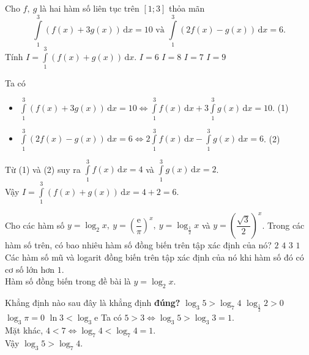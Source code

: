 \begin{ex}%
	Cho $f,~g$ là hai hàm số liên tục trên $[1;3]$ thỏa mãn
	\[\displaystyle\int\limits_1^3 \left(f(x)+3g(x)\right)\mathrm{\,d}x=10\text{ và } \displaystyle\int\limits_1^3 \left(2f(x)-g(x)\right)\mathrm{\,d}x=6.\] 
	Tính $I=\displaystyle\int\limits_1^3 \left(f(x)+g(x)\right)\mathrm{\,d}x$.
	\choice
	{\True $I=6$}
	{$I=8$}
	{$I=7$}
	{$I=9$}
	\loigiai
	{
		Ta có 
		\begin{itemize}
			\item $\displaystyle\int\limits_1^3 \left(f(x)+3g(x)\right)\mathrm{\,d}x=10\Leftrightarrow\displaystyle\int\limits_1^3 f(x)\mathrm{\,d}x+3\displaystyle\int\limits_1^3 g(x)\mathrm{\,d}x=10$. \qquad(1)
			\item $\displaystyle\int\limits_1^3 \left(2f(x)-g(x)\right)\mathrm{\,d}x=6\Leftrightarrow\displaystyle2\int\limits_1^3 f(x)\mathrm{\,d}x-\displaystyle\int\limits_1^3 g(x)\mathrm{\,d}x=6$. \qquad(2)
		\end{itemize}
		Từ (1) và (2) suy ra $\displaystyle\int\limits_1^3 f(x)\mathrm{\,d}x=4$ và $\displaystyle\int\limits_1^3 g(x)\mathrm{\,d}x=2$.\\
		Vậy $I=\displaystyle\int\limits_1^3 \left(f(x)+g(x)\right)\mathrm{\,d}x=4+2=6$.
	}
\end{ex}

\begin{ex}%
	Cho các hàm số $y=\log_2 x,~ y=\left(\dfrac{\mathrm{e}}{\pi}\right)^x,~ y=\log_{\tfrac{1}{2}} x$ và $y=\left(\dfrac{\sqrt{3}}{2}\right)^x$. Trong các hàm số trên, có bao nhiêu hàm số đồng biến trên tập xác định của nó?
	\choice
	{$2$}
	{$4$}
	{$3$}
	{\True $1$}
	\loigiai
	{
		Các hàm số mũ và logarit đồng biến trên tập xác định của nó khi hàm số đó có cơ số lớn hơn $1$.\\
		Hàm số đồng biến trong đề bài là $y=\log_2 x$.
	}
\end{ex}

\begin{ex}%
	Khẳng định nào sau đây là khẳng định \textbf{đúng?}
	\choice
	{\True $\log_3 5>\log_7 4$}
	{$\log_{\tfrac{1}{2}} 2>0$}
	{$\log_3 \pi=0$}
	{$\ln 3<\log_3 \mathrm{e}$}
	\loigiai
	{
		Ta có $5>3\Leftrightarrow \log_3 5>\log_3 3=1$.\\
		Mặt khác, $4<7\Leftrightarrow \log_7 4<\log_7 4=1.$ \\
		Vậy $\log_3 5>\log_7 4$.
	}
\end{ex}

